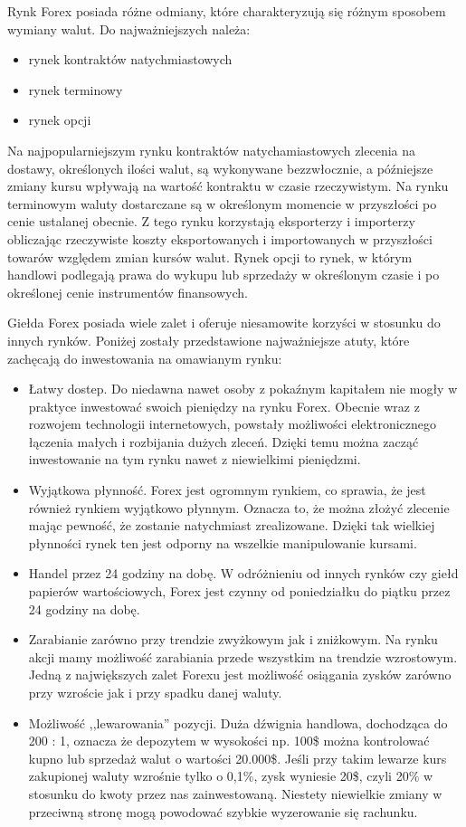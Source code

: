 \documentclass[pdflatex,11pt]{aghdpl}
\begin{document}
Rynk Forex posiada różne odmiany, które charakteryzują się różnym sposobem wymiany walut. Do najważniejszych należa:
\begin{itemize}
\item rynek kontraktów natychmiastowych
\item rynek terminowy
\item rynek opcji
\end{itemize}

Na najpopularniejszym rynku kontraktów natychamiastowych zlecenia na dostawy, określonych ilości walut, są wykonywane bezzwłocznie, a późniejsze zmiany kursu wpływają na wartość kontraktu w czasie rzeczywistym. Na rynku terminowym waluty dostarczane są w określonym momencie w przyszłości po cenie ustalanej obecnie. Z tego rynku korzystają eksporterzy i importerzy obliczając rzeczywiste koszty eksportowanych i importowanych w przyszłości towarów względem zmian kursów walut. Rynek opcji to rynek, w którym handlowi podlegają prawa do wykupu lub sprzedaży w określonym czasie i po określonej cenie instrumentów finansowych. 

Giełda Forex posiada wiele zalet i oferuje niesamowite korzyści w stosunku do innych rynków. Poniżej zostały przedstawione najważniejsze atuty, które zachęcają do inwestowania na omawianym rynku:
\begin{itemize}
\item Łatwy dostep. 
Do niedawna nawet osoby z pokaźnym kapitałem nie mogły w praktyce inwestować swoich pieniędzy na rynku Forex. Obecnie wraz z rozwojem technologii internetowych, powstały możliwości elektronicznego łączenia małych i rozbijania dużych zleceń. Dzięki temu można zacząć inwestowanie na tym rynku nawet z niewielkimi pieniędzmi.
\item Wyjątkowa płynność. 
Forex jest ogromnym rynkiem, co sprawia, że jest również rynkiem wyjątkowo płynnym. Oznacza to, że można złożyć zlecenie mając pewność, że zostanie natychmiast zrealizowane. Dzięki tak wielkiej płynności rynek ten jest odporny na wszelkie manipulowanie kursami.
\item Handel przez 24 godziny na dobę. 
W odróżnieniu od innych rynków czy giełd papierów wartościowych, Forex jest czynny od poniedziałku do piątku przez 24 godziny na dobę. 
\item Zarabianie zarówno przy trendzie zwyżkowym jak i zniżkowym.
Na rynku akcji mamy możliwość zarabiania przede wszystkim na trendzie wzrostowym. Jedną z największych zalet Forexu jest możliwość osiągania zysków zarówno przy wzroście jak i przy spadku danej waluty.
\item Możliwość ,,lewarowania'' pozycji.
Duża dźwignia handlowa, dochodząca do 200 : 1, oznacza że depozytem w wysokości np. 100\$ można kontrolować kupno lub sprzedaż walut o wartości 20.000\$. Jeśli przy takim lewarze kurs zakupionej waluty wzrośnie tylko o 0,1\%, zysk wyniesie 20\$, czyli 20\% w stosunku do kwoty przez nas zainwestowaną. Niestety niewielkie zmiany w przeciwną stronę mogą powodować szybkie wyzerowanie się rachunku.
\end{itemize}
\end{document}
